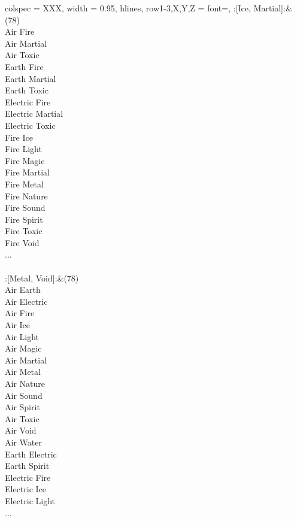 \begin{longtblr}[
	caption = {2v2 Defending Weak},
	label = {2v2-Defending-Weak},
]{
	colspec = {XXX}, width = 0.95\linewidth,
	hlines,
	row{1-3,X,Y,Z} = {font=\bfseries},
}
	:[Ice, Martial]:&{(78)\\
	Air Fire \\
	Air Martial \\
	Air Toxic \\
	Earth Fire \\
	Earth Martial \\
	Earth Toxic \\
	Electric Fire \\
	Electric Martial \\
	Electric Toxic \\
	Fire Ice \\
	Fire Light \\
	Fire Magic \\
	Fire Martial \\
	Fire Metal \\
	Fire Nature \\
	Fire Sound \\
	Fire Spirit \\
	Fire Toxic \\
	Fire Void \\
	...\\
	}\\

	:[Metal, Void]:&{(78)\\
	Air Earth \\
	Air Electric \\
	Air Fire \\
	Air Ice \\
	Air Light \\
	Air Magic \\
	Air Martial \\
	Air Metal \\
	Air Nature \\
	Air Sound \\
	Air Spirit \\
	Air Toxic \\
	Air Void \\
	Air Water \\
	Earth Electric \\
	Earth Spirit \\
	Electric Fire \\
	Electric Ice \\
	Electric Light \\
	...\\
	}\\


\end{longtblr}
